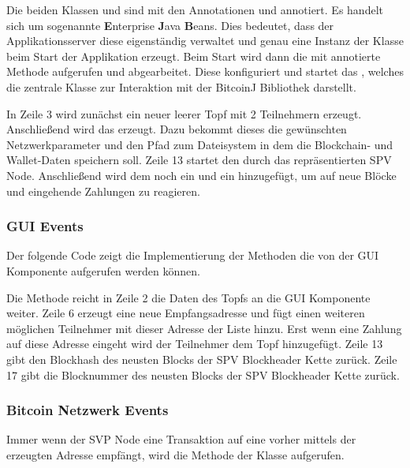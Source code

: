 
Die beiden Klassen  und  sind mit den Annotationen und  annotiert. Es handelt sich um sogenannte \textbf{E}nterprise \textbf{J}ava \textbf{B}eans. Dies bedeutet, dass der Applikationsserver diese eigenständig verwaltet und genau eine Instanz der Klasse beim Start der Applikation erzeugt. Beim Start wird dann die mit  annotierte  Methode aufgerufen und abgearbeitet. Diese konfiguriert und startet das , welches die zentrale Klasse zur Interaktion mit der BitcoinJ Bibliothek darstellt.

 In Zeile 3 wird zunächst ein neuer leerer Topf mit 2 Teilnehmern erzeugt. Anschließend wird das  erzeugt. Dazu bekommt dieses die gewünschten Netzwerkparameter und den Pfad zum Dateisystem in dem  die Blockchain- und Wallet-Daten speichern soll. Zeile 13 startet den durch das  repräsentierten SPV Node. Anschließend wird dem  noch ein  und ein  hinzugefügt, um auf neue Blöcke und eingehende Zahlungen zu reagieren.

\subsubsection{GUI Events}

Der folgende Code zeigt die Implementierung der Methoden die von der GUI Komponente aufgerufen werden können.

Die Methode  reicht in Zeile 2 die Daten des Topfs an die GUI Komponente weiter. Zeile 6 erzeugt eine neue Empfangsadresse und fügt einen weiteren möglichen Teilnehmer mit dieser Adresse der  Liste hinzu. Erst wenn eine Zahlung auf diese Adresse eingeht wird der Teilnehmer dem Topf hinzugefügt. Zeile 13 gibt den Blockhash des neusten Blocks der SPV Blockheader Kette zurück. Zeile 17 gibt die Blocknummer des neusten Blocks der SPV Blockheader Kette zurück.

\subsubsection{Bitcoin Netzwerk Events}

Immer wenn der SVP Node eine Transaktion auf eine vorher mittels der\\  erzeugten Adresse empfängt, wird die  Methode der Klasse  aufgerufen.

